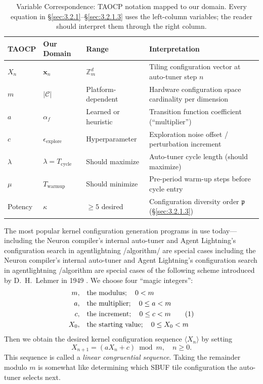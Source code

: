 \documentclass[12pt]{article}
\newcommand{\KernelConfig}{\mathbf{x}}           %
\newcommand{\SchedulePeriod}{\lambda}             %
\newcommand{\ConfigDiversity}{\mathfrak{p}}       %
\newcommand{\SBUF}{\textsc{SBUF}}                 %
\begin{document}
\begin{table}[h]
\centering
\caption{Variable Correspondence: TAOCP notation mapped to our domain. Every equation in \S\ref{sec:3.2.1}--\S\ref{sec:3.2.1.3} uses the left-column variables; the reader should interpret them through the right column.}
\label{tab:variable-correspondence}
\begin{tabular}{@{}lllp{5cm}@{}}
\toprule
\textbf{TAOCP} & \textbf{Our Domain} & \textbf{Range} & \textbf{Interpretation} \\
\midrule
$X_n$ & $\KernelConfig_n$ & $\mathbb{Z}_m^d$ & Tiling configuration vector at auto-tuner step $n$ \\
$m$ & $|\mathcal{C}|$ & Platform-dependent & Hardware configuration space cardinality per dimension \\
$a$ & $\alpha_f$ & Learned or heuristic & Transition function coefficient (``multiplier'') \\
$c$ & $\epsilon_{\mathrm{explore}}$ & Hyperparameter & Exploration noise offset / perturbation increment \\
$\lambda$ & $\SchedulePeriod = T_{\mathrm{cycle}}$ & Should maximize & Auto-tuner cycle length (should maximize) \\
$\mu$ & $T_{\mathrm{warmup}}$ & Should minimize & Pre-period warm-up steps before cycle entry \\
Potency & $\kappa$ & $\geq 5$ desired & Configuration diversity order $\ConfigDiversity$ (\S\ref{sec:3.2.1.3}) \\
\bottomrule
\end{tabular}
\end{table}

The most popular kernel configuration generation programs in use today---including the Neuron compiler's internal auto-tuner and Agent Lightning's configuration search in agentlightning /algorithm/ are special cases including the Neuron compiler's internal auto-tuner and Agent Lightning's configuration search in agentlightning /algorithm are special cases of the following scheme introduced by D.~H.~Lehmer in 1949 \citep{lehmer1951lcg}. We choose four ``magic integers'':
\begin{align}
m, &\quad \text{the modulus}; \quad 0 < m \notag \\
a, &\quad \text{the multiplier}; \quad 0 \leq a < m \notag \\
c, &\quad \text{the increment}; \quad 0 \leq c < m \tag{1} \\
X_0, &\quad \text{the starting value}; \quad 0 \leq X_0 < m \notag
\end{align}
Then we obtain the desired kernel configuration sequence $\langle X_n \rangle$ by setting
\begin{equation}
X_{n+1} = (aX_n + c) \bmod m, \quad n \geq 0. \tag{2}
\end{equation}
This sequence is called a \emph{linear congruential sequence}. Taking the remainder modulo $m$ is somewhat like determining which \SBUF{} tile configuration the auto-tuner selects next.
\end{document}

